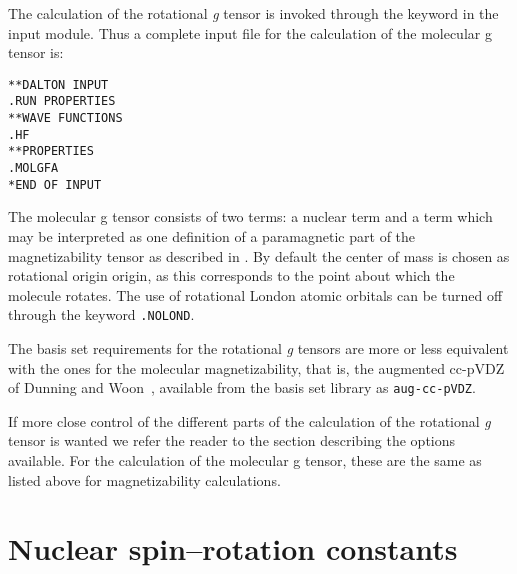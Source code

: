 The calculation of the rotational  {\em g} tensor is invoked through the 
keyword  in the  input module. Thus a complete
input file for the calculation of the molecular g tensor is:

\begin{verbatim}
**DALTON INPUT
.RUN PROPERTIES
**WAVE FUNCTIONS
.HF
**PROPERTIES
.MOLGFA
*END OF INPUT
\end{verbatim}

The molecular g tensor consists of two terms: a nuclear term and a
term which may be interpreted as one definition of a paramagnetic part
of the magnetizability tensor as 
described in \cite{jgkrthjcp105}.
By default the center of mass is chosen as
rotational origin 
origin, as this corresponds to the point about which the molecule
rotates. The use of rotational London atomic
orbitals can be turned off through 
the keyword \verb|.NOLOND|.

The basis set requirements for the rotational {\em g} tensors are more or
less equivalent with the ones for the molecular magnetizability,
that is, the augmented cc-pVDZ of Dunning and
Woon~\cite{thdjcp90,dewthdjcp98}, available from the basis set library
as \verb|aug-cc-pVDZ|.

If more close control of the different parts of the calculation of the
rotational {\em g}  tensor is wanted we refer the reader to the section
describing the options available. For the calculation of the molecular
g tensor, these are the same as listed above for magnetizability
calculations.

\section{Nuclear spin--rotation constants}\label{sec:spinrotasjon}

\begin{center}
\end{center}



